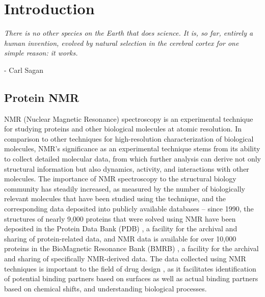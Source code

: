 \chapter{Introduction}

\begin{center}
  \textit{There is no other species on the Earth that does science. It is, so 
    far, entirely a human invention, evolved by natural selection in the 
    cerebral cortex for one simple reason: it works.}

 - Carl Sagan
\end{center}

\section{Protein NMR}
NMR (Nuclear Magnetic Resonance) spectroscopy is an experimental technique for 
studying proteins and other biological molecules at atomic resolution.  In 
comparison to other techniques for high-resolution characterization of 
biological molecules, NMR's significance as an experimental technique stems 
from its ability to collect detailed molecular data, from which further 
analysis can derive not only structural information but also dynamics, 
activity, and interactions with other molecules.  The importance of NMR 
spectroscopy to the structural biology community has steadily increased, as 
measured by the number of biologically relevant molecules that have been 
studied using the technique, and the corresponding data deposited into 
publicly available databases -- since 1990, the structures of nearly 9,000 
proteins that were solved using NMR have been deposited in the Protein Data 
Bank (PDB) \cite{pdb}, a facility for the archival and sharing of protein-related 
data, and NMR data is available for over 10,000 proteins in the BioMagnetic 
Resonance Bank (BMRB) \cite{bmrb}, a facility for the archival and sharing of 
specifically NMR-derived data.  The data collected using NMR techniques is 
important to the field of drug design 
\cite{stockman2002drugs, moore2003leveraging, reckel2011proteorhodopsin}, 
as it facilitates identification of potential 
binding partners based on surfaces as well as actual binding partners based on 
chemical shifts, and understanding biological processes.




